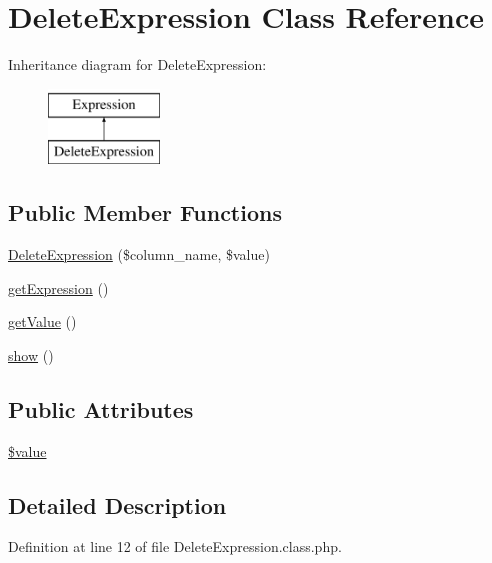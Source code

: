 \hypertarget{classDeleteExpression}{\section{Delete\-Expression Class Reference}
\label{classDeleteExpression}
}
Inheritance diagram for Delete\-Expression\-:\begin{figure}[H]
\begin{center}
\leavevmode
\includegraphics[height=2.000000cm]{classDeleteExpression}
\end{center}
\end{figure}
\subsection*{Public Member Functions}
\begin{DoxyCompactItemize}
\item 
\hyperlink{classDeleteExpression_a1749423fab43333921d29c288a5c1b89}{Delete\-Expression} (\$column\-\_\-name, \$value)
\item 
\hyperlink{classDeleteExpression_acf2477afffe27b73797829c852431aec}{get\-Expression} ()
\item 
\hyperlink{classDeleteExpression_a37759c2867e64b62368539706fdf9a43}{get\-Value} ()
\item 
\hyperlink{classDeleteExpression_a6e7d4bdf884830a90e0ed0aba7619f67}{show} ()
\end{DoxyCompactItemize}
\subsection*{Public Attributes}
\begin{DoxyCompactItemize}
\item 
\hyperlink{classDeleteExpression_a8e5b6ee335281d42c6e40a462b83cf64}{\$value}
\end{DoxyCompactItemize}


\subsection{Detailed Description}


Definition at line 12 of file Delete\-Expression.\-class.\-php.



